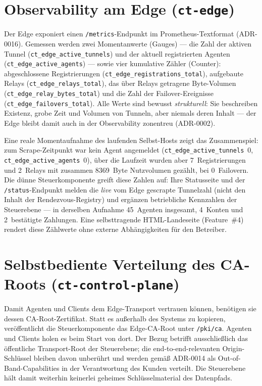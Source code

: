 \section{Observability am Edge (\texttt{ct-edge})}
\label{sec:impl-metrics}

Der Edge exponiert einen \texttt{/metrics}-Endpunkt im Prometheus-Textformat
(ADR-0016). Gemessen werden zwei Momentanwerte (Gauges) --- die Zahl der aktiven
Tunnel (\texttt{ct\_edge\_active\_tunnels}) und der aktuell registrierten
Agenten (\texttt{ct\_edge\_active\_agents}) --- sowie vier kumulative Zähler
(Counter): abgeschlossene Registrierungen
(\texttt{ct\_edge\_registrations\_total}), aufgebaute Relays
(\texttt{ct\_edge\_relays\_total}), das über Relays getragene Byte-Volumen
(\texttt{ct\_edge\_relay\_bytes\_total}) und die Zahl der Failover-Ereignisse
(\texttt{ct\_edge\_failovers\_total}). Alle Werte sind bewusst \emph{strukturell}:
Sie beschreiben Existenz, grobe Zeit und Volumen von Tunneln, aber niemals deren
Inhalt --- der Edge bleibt damit auch in der Observability zonentreu (ADR-0002).

Eine reale Momentaufnahme des laufenden Selbst-Hosts zeigt das Zusammenspiel:
zum Scrape-Zeitpunkt war kein Agent angemeldet
(\texttt{ct\_edge\_active\_tunnels}~0, \texttt{ct\_edge\_active\_agents}~0), über
die Laufzeit wurden aber 7~Registrierungen und 2~Relays mit zusammen 8369~Byte
Nutzvolumen gezählt, bei 0~Failovern. Die dünne Steuerkomponente greift diese
Zahlen auf: Ihre Statusseite und der \texttt{/status}-Endpunkt melden die
\emph{live} vom Edge gescrapte Tunnelzahl (nicht den Inhalt der
Rendezvous-Registry) und ergänzen betriebliche Kennzahlen der Steuerebene ---
in derselben Aufnahme 45~Agenten insgesamt, 4~Konten und 2~bestätigte
Zahlungen. Eine selbsttragende HTML-Landeseite (Feature~\#4) rendert diese
Zählwerte ohne externe Abhängigkeiten für den Betreiber.

\section{Selbstbediente Verteilung des CA-Roots (\texttt{ct-control-plane})}
\label{sec:impl-pki}

Damit Agenten und Clients dem Edge-Transport vertrauen können, benötigen sie
dessen CA-Root-Zertifikat. Statt es außerhalb des Systems zu kopieren,
veröffentlicht die Steuerkomponente das Edge-CA-Root unter \texttt{/pki/ca}.
Agenten und Clients holen es beim Start von dort. Der Bezug betrifft
ausschließlich das öffentliche Transport-Root der Steuerebene; die
end-to-end-relevanten Origin-Schlüssel bleiben davon unberührt und werden gemäß
ADR-0014 als Out-of-Band-Capabilities in der Verantwortung des Kunden
verteilt. Die Steuerebene hält damit weiterhin keinerlei geheimes
Schlüsselmaterial des Datenpfads.

